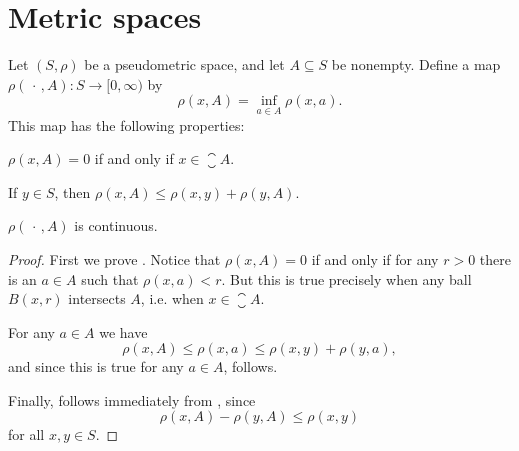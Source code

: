 \documentclass[article, a4paper, 11pt, oneside]{memoir}
\numberwithin{equation}{chapter}
\begin{document}
\section{Metric spaces}

\begin{lemma}
    \label{thm:distance-to-set}
    Let $(S,\rho)$ be a pseudometric space, and let $A \subseteq S$ be nonempty. Define a map $\rho(\,\cdot\,, A) \colon S \to [0, \infty)$ by
    \begin{equation*}
        \rho(x, A) = \inf_{a \in A} \rho(x,a).
    \end{equation*}
    This map has the following properties:
    \begin{enumlem}
        \item \label{enum:distance-to-set-closure} $\rho(x,A) = 0$ if and only if $x \in \closure{A}$.

        \item \label{enum:distance-to-set-triangle-inequality} If $y \in S$, then $\rho(x,A) \leq \rho(x,y) + \rho(y,A)$.

        \item \label{enum:distance-to-set-continuous} $\rho(\,\cdot\,, A)$ is continuous.
    \end{enumlem}
\end{lemma}

\begin{proof}
    First we prove . Notice that $\rho(x,A) = 0$ if and only if for any $r > 0$ there is an $a \in A$ such that $\rho(x,a) < r$. But this is true precisely when any ball $B(x,r)$ intersects $A$, i.e. when $x \in \closure{A}$.

    For any $a \in A$ we have
    \begin{equation*}
        \rho(x,A)
            \leq \rho(x,a)
            \leq \rho(x,y) + \rho(y,a),
    \end{equation*}
    and since this is true for any $a \in A$,  follows.

    Finally,  follows immediately from , since
    \begin{equation*}
        \rho(x,A) - \rho(y,A)
            \leq \rho(x,y)
    \end{equation*}
    for all $x,y \in S$.
\end{proof}
\end{document}
